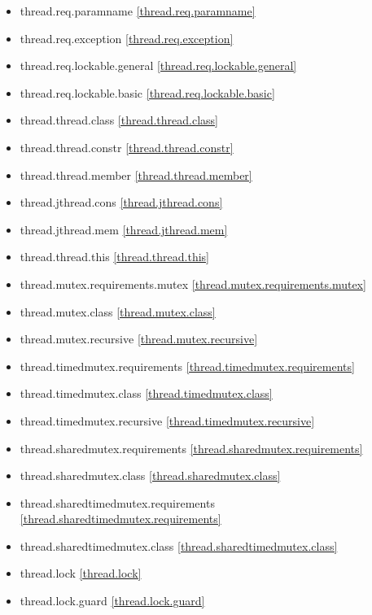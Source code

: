\begin{multicols}{2}
\begin{itemize}
\item{thread.req.paramname                  \ref{thread.req.paramname}}
\item{thread.req.exception                  \ref{thread.req.exception}}
\item{thread.req.lockable.general           \ref{thread.req.lockable.general}}
\item{thread.req.lockable.basic             \ref{thread.req.lockable.basic}}
\item{thread.thread.class                   \ref{thread.thread.class}}
\item{thread.thread.constr                  \ref{thread.thread.constr}}
\item{thread.thread.member                  \ref{thread.thread.member}}
\item{thread.jthread.cons                   \ref{thread.jthread.cons}}
\item{thread.jthread.mem                    \ref{thread.jthread.mem}}
\item{thread.thread.this                    \ref{thread.thread.this}}
\item{thread.mutex.requirements.mutex       \ref{thread.mutex.requirements.mutex}}
\item{thread.mutex.class                    \ref{thread.mutex.class}}
\item{thread.mutex.recursive                \ref{thread.mutex.recursive}}
\item{thread.timedmutex.requirements        \ref{thread.timedmutex.requirements}}
\item{thread.timedmutex.class               \ref{thread.timedmutex.class}}
\item{thread.timedmutex.recursive           \ref{thread.timedmutex.recursive}}
\item{thread.sharedmutex.requirements       \ref{thread.sharedmutex.requirements}}
\item{thread.sharedmutex.class              \ref{thread.sharedmutex.class}}
\item{thread.sharedtimedmutex.requirements  \ref{thread.sharedtimedmutex.requirements}}
\item{thread.sharedtimedmutex.class         \ref{thread.sharedtimedmutex.class}}
\item{thread.lock                           \ref{thread.lock}}
\item{thread.lock.guard                     \ref{thread.lock.guard}}

\end{itemize}
\end{multicols}
